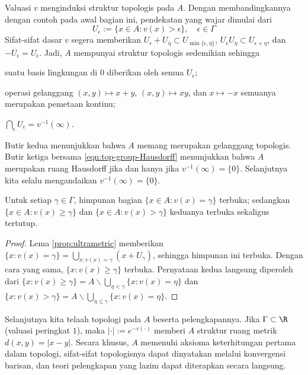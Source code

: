 Valuasi $v$ menginduksi struktur topologis pada $A$. Dengan membandingkannya dengan contoh pada awal bagian ini, pendekatan yang wajar dimulai dari
\[ U_\epsilon := \{x \in A: v(x) > \epsilon \}, \quad \epsilon \in \Gamma \]
Sifat-sifat dasar $v$ segera memberikan $U_\epsilon + U_\eta \subset U_{\min\{\epsilon, \eta\}}$, $U_\epsilon U_\eta \subset U_{\epsilon+\eta}$, dan $-U_\epsilon = U_\epsilon$. Jadi, $A$ mempunyai struktur topologis sedemikian sehingga
\begin{compactitem}
	\item suatu basis lingkungan di $0$ diberikan oleh semua $U_\epsilon$;
	\item operasi gelanggang $(x,y) \mapsto x+y$, $(x,y) \mapsto xy$, dan $x \mapsto -x$ semuanya merupakan pemetaan kontinu;
	\item $\bigcap_\epsilon U_\epsilon = v^{-1}(\infty)$.
\end{compactitem}
Butir kedua menunjukkan bahwa $A$ memang merupakan gelanggang topologis. Butir ketiga bersama \eqref{eqn:top-group-Hausdorff} menunjukkan bahwa $A$ merupakan ruang Hausdorff jika dan hanya jika $v^{-1}(\infty) = \{0\}$. Selanjutnya kita selalu mengandaikan $v^{-1}(\infty) = \{0\}$.

\begin{lemma}\label{prop:valuation-openness}
	Untuk setiap $\gamma \in \Gamma$, himpunan bagian $\{x \in A: v(x) = \gamma\}$ terbuka; sedangkan $\{x \in A : v(x) \geq \gamma\}$ dan $\{x \in A: v(x) > \gamma\}$ keduanya terbuka sekaligus tertutup.
\end{lemma}
\begin{proof}
	Lema \ref{prop:ultrametric} memberikan $\{x: v(x) = \gamma\} = \bigcup_{x: v(x) = \gamma} (x + U_\gamma)$, sehingga himpunan ini terbuka. Dengan cara yang sama, $\{x: v(x) \geq \gamma\}$ terbuka. Pernyataan kedua langsung diperoleh dari $\{ x : v(x) \geq \gamma \} = A \smallsetminus \bigcup_{\eta < \gamma} \{ x : v(x) = \eta \}$ dan $\{ x : v(x) > \gamma \} = A \smallsetminus \bigcup_{\eta \leq \gamma} \{ x : v(x) = \eta \}$.
\end{proof}

Selanjutnya kita telaah topologi pada $A$ beserta pelengkapannya. Jika $\Gamma \subset \R$ (valuasi peringkat $1$), maka $|\cdot| := e^{-v(\cdot)}$ memberi $A$ struktur ruang metrik $d(x,y) = |x-y|$. Secara khusus, $A$ memenuhi aksioma keterhitungan pertama dalam topologi, sifat-sifat topologisnya dapat dinyatakan melalui konvergensi barisan, dan teori pelengkapan yang lazim dapat diterapkan secara langsung.

